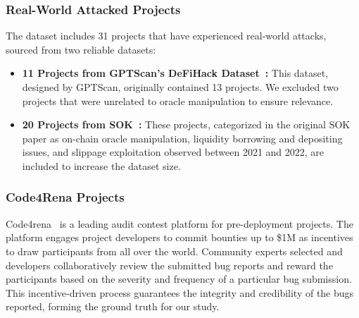 \subsubsection{Real-World Attacked Projects}
The dataset includes 31 projects that have experienced real-world attacks, sourced from two reliable datasets:
\begin{itemize}
\item \textbf{11 Projects from GPTScan's DeFiHack Dataset~\cite{sun2023gptscan}:} This dataset, designed by GPTScan, originally contained 13 projects. We excluded two projects that were unrelated to oracle manipulation to ensure relevance.

\item \textbf{20 Projects from SOK~\cite{zhou2023sok}:} These projects, categorized in the original SOK paper as on-chain oracle manipulation, liquidity borrowing and depositing issues, and slippage exploitation observed between 2021 and 2022, are included to increase the dataset size.
\end{itemize}

\subsubsection{Code4Rena Projects}
Code4rena~\cite{code4rena} is a leading audit contest platform for pre-deployment projects. The platform engages project developers to commit bounties up to \$1M as incentives to draw participants from all over the world. 
Community experts selected and developers collaboratively review the submitted bug reports and reward the participants based on the severity and frequency of a particular bug submission. This incentive-driven process guarantees the integrity and credibility of the bugs reported, forming the ground truth for our study.

